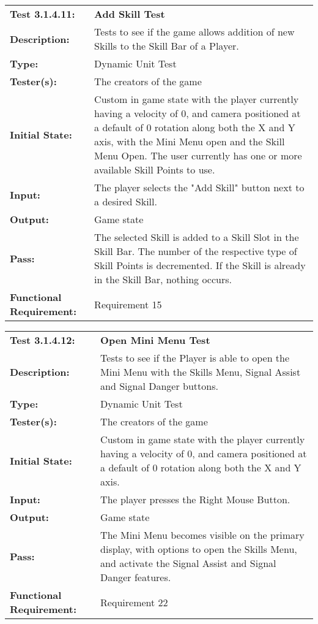 \documentclass[12pt, titlepage]{article}
\begin{document}
\begin{mdframed}[linewidth=1pt]
\begin{tabularx}{\textwidth}{@{}p{3cm}X@{}}
{\bf Test 3.1.4.11:} & {\bf Add Skill Test}\\[\baselineskip]
{\bf Description:} & Tests to see if the game allows addition of new Skills to the Skill Bar of a Player. \\[0.5\baselineskip]
{\bf Type:} & Dynamic Unit Test\\[0.5\baselineskip]
{\bf Tester(s):} & The creators of the game\\[0.5\baselineskip]
{\bf Initial State:} & Custom in game state with the player currently having a velocity of 0, and camera positioned at a default of 0 rotation along both the X and Y axis, with the Mini Menu open and the Skill Menu Open. The user currently has one or more available Skill Points to use. \\[0.5\baselineskip]
{\bf Input:} & The player selects the "Add Skill" button next to a desired Skill. \\[0.5\baselineskip]
{\bf Output:} & Game state\\[0.5\baselineskip]
{\bf Pass:} & The selected Skill is added to a Skill Slot in the Skill Bar. The number of the respective type of Skill Points is decremented. If the Skill is already in the Skill Bar, nothing occurs. \\[0.5\baselineskip]
{\bf Functional Requirement:} & Requirement 15
\end{tabularx}
\end{mdframed}

\begin{mdframed}[linewidth=1pt]
\begin{tabularx}{\textwidth}{@{}p{3cm}X@{}}
{\bf Test 3.1.4.12:} & {\bf Open Mini Menu Test}\\[\baselineskip]
{\bf Description:} & Tests to see if the Player is able to open the Mini Menu with the Skills Menu, Signal Assist and Signal Danger buttons. \\[0.5\baselineskip]
{\bf Type:} & Dynamic Unit Test\\[0.5\baselineskip]
{\bf Tester(s):} & The creators of the game\\[0.5\baselineskip]
{\bf Initial State:} & Custom in game state with the player currently having a velocity of 0, and camera positioned at a default of 0 rotation along both the X and Y axis. \\[0.5\baselineskip]
{\bf Input:} & The player presses the Right Mouse Button. \\[0.5\baselineskip]
{\bf Output:} & Game state\\[0.5\baselineskip]
{\bf Pass:} & The Mini Menu becomes visible on the primary display, with options to open the Skills Menu, and activate the Signal Assist and Signal Danger features. \\[0.5\baselineskip]
{\bf Functional Requirement:} & Requirement 22
\end{tabularx}
\end{mdframed}
\end{document}
